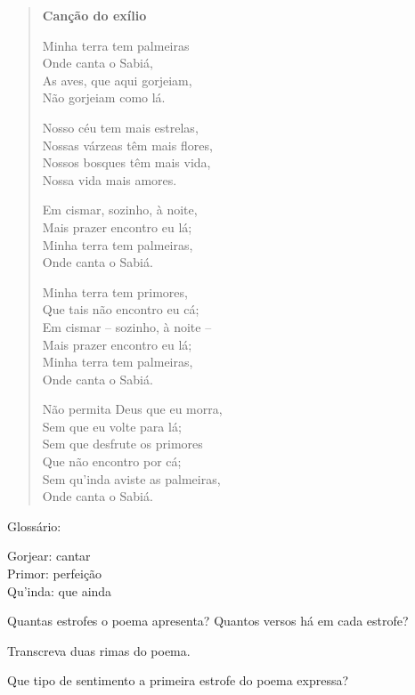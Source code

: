 \begin{quote}
\textbf{Canção do exílio}

Minha terra tem palmeiras\\
Onde canta o Sabiá,\\
As aves, que aqui gorjeiam,\\
Não gorjeiam como lá.

Nosso céu tem mais estrelas,\\
Nossas várzeas têm mais flores,\\
Nossos bosques têm mais vida,\\
Nossa vida mais amores.

Em cismar, sozinho, à noite,\\
Mais prazer encontro eu lá;\\
Minha terra tem palmeiras,\\
Onde canta o Sabiá.

Minha terra tem primores,\\
Que tais não encontro eu cá;\\
Em cismar -- sozinho, à noite --\\
Mais prazer encontro eu lá;\\
Minha terra tem palmeiras,\\
Onde canta o Sabiá.

Não permita Deus que eu morra,\\
Sem que eu volte para lá;\\
Sem que desfrute os primores\\
Que não encontro por cá;\\
Sem qu'inda aviste as palmeiras,\\
Onde canta o Sabiá.

\end{quote}

Glossário:

Gorjear: cantar\\
Primor: perfeição\\
Qu'inda: que ainda

\begin{escolha}
\item Quantas estrofes o poema apresenta? Quantos versos há em cada
estrofe?



\item Transcreva duas rimas do poema.



\item Que tipo de sentimento a primeira estrofe do poema expressa?

\end{escolha}


